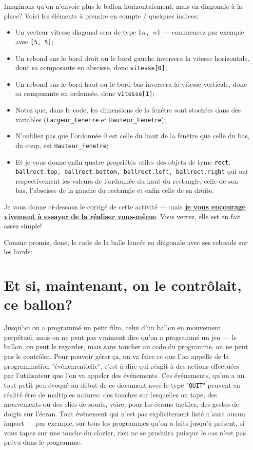 \documentclass[11pt]{article}
\begin{document}
	\begin{MonAct}
		Imaginons qu'on n'envoie plus le ballon horizontalement, mais en diagonale à la place? Voici les éléments à prendre en compte / quelques indices:
		\begin{itemize}
			\item Un vecteur vitesse diagonal sera de type \texttt{[$n$, $n$]} --- commencez par exemple avec \texttt{[5, 5]};
			\item Un rebond sur le bord droit ou le bord gauche inversera la vitesse horizontale, donc sa composante en abscisse, donc \texttt{vitesse[0]};
			\item Un rebond sur le bord haut ou le bord bas inversera la vitesse verticale, donc sa composante en ordonnée, donc \texttt{vitesse[1]};
			\item Notez que, dans le code, les dimensions de la fenêtre sont stockées dans des variables (\texttt{Largeur\_Fenetre} et \texttt{Hauteur\_Fenetre});
			\item N'oubliez pas que l'ordonnée 0 est celle du haut de la fenêtre que celle du bas, du coup, est \texttt{Hauteur\_Fenetre};
			\item Et je vous donne enfin quatre propriétés utiles des objets de tyme \texttt{rect}: \texttt{ballrect.top, ballrect.bottom, ballrect.left, ballrect.right} qui ont respectivement les valeurs de l'ordonnée du haut du rectangle, celle de son bas, l'abscisse de la gauche du rectangle et enfin celle de sa droite.
		\end{itemize}
		
		Je vous donne ci-dessous le corrigé de cette activité --- mais \uline{\textbf{je vous encourage vivement à essayer de la réaliser vous-même}}. Vous verrez, elle est en fait assez simple!
	\end{MonAct}
	
	Comme promis, donc, le code de la balle lancée en diagonale avec ses rebonds sur les bords:
	\label{RebondDiag}
	
	\section{Et si, maintenant, on le contrôlait, ce ballon?}
	Jusqu'ici on a programmé un petit film, celui d'un ballon en mouvement perpétuel, mais on ne peut pas vraiment dire qu'on a programmé un jeu --- le ballon, on peut le regarder, mais sans toucher au code du programme, on ne peut pas le contrôler. Pour pouvoir gérer ça, on va faire ce que l'on appelle de la programmation "événementielle", c'est-à-dire qui réagit à des actions effectuées par l'utilisateur que l'on va appeler des événements. Ces événements, qu'on a un tout petit peu évoqué au début de ce document avec le type "\texttt{QUIT}" peuvent en réalité être de multiples natures: des touches sur lesquelles on tape, des mouvements ou des clics de souris, voire, pour les écrans tactiles, des gestes de doigts sur l'écran. Tout événement qui n'est pas explicitement listé n'aura aucun impact --- par exemple, sur tous les programmes qu'on a faits jusqu'à présent, si vous tapez sur une touche du clavier, rien ne se produira puisque le cas n'est pas prévu dans le programme.
	
\end{document}
